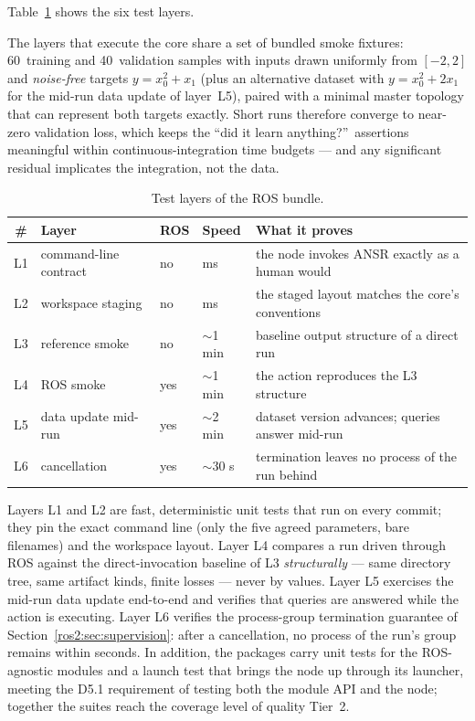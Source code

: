Table~\ref{ros2:tab:tests} shows the six test layers.

The layers that execute the core share a set of bundled smoke fixtures:
60~training and 40~validation samples with inputs drawn uniformly from
$[-2,2]$ and \emph{noise-free} targets $y = x_0^2 + x_1$ (plus an alternative
dataset with $y = x_0^2 + 2x_1$ for the mid-run data update of layer~L5),
paired with a minimal master topology that can represent both targets
exactly. Short runs therefore converge to near-zero validation loss, which
keeps the ``did it learn anything?''\ assertions meaningful within
continuous-integration time budgets --- and any significant residual
implicates the integration, not the data.

\begin{table}[tb]
  \centering
  \caption{Test layers of the ROS bundle.}
  \label{ros2:tab:tests}
  \footnotesize
  \begin{tabular}{@{}clllp{5.1cm}@{}}
    \toprule
    \# & Layer & ROS & Speed & What it proves \\
    \midrule
    L1 & command-line contract & no  & ms         & the node invokes ANSR exactly as a human would \\
    L2 & workspace staging     & no  & ms         & the staged layout matches the core's conventions \\
    L3 & reference smoke       & no  & $\sim$1 min & baseline output structure of a direct run \\
    L4 & ROS smoke             & yes & $\sim$1 min & the action reproduces the L3 structure \\
    L5 & data update mid-run   & yes & $\sim$2 min & dataset version advances; queries answer mid-run \\
    L6 & cancellation          & yes & $\sim$30 s  & termination leaves no process of the run behind \\
    \bottomrule
  \end{tabular}
\end{table}

Layers L1 and L2 are fast, deterministic unit tests that run on every
commit; they pin the exact command line (only the five agreed parameters,
bare filenames) and the workspace layout. Layer L4 compares a run driven
through ROS against the direct-invocation baseline of L3 \emph{structurally}
--- same directory tree, same artifact kinds, finite losses --- never by
values. Layer L5 exercises the mid-run data update end-to-end and verifies
that queries are answered while the action is executing. Layer L6 verifies
the process-group termination guarantee of
Section~\ref{ros2:sec:supervision}: after a cancellation, no process of the
run's group remains within seconds. In addition, the packages carry unit
tests for the ROS-agnostic modules and a launch test that brings the node up
through its launcher, meeting the D5.1 requirement of testing both the
module API and the node; together the suites reach the coverage level of
quality Tier~2.

